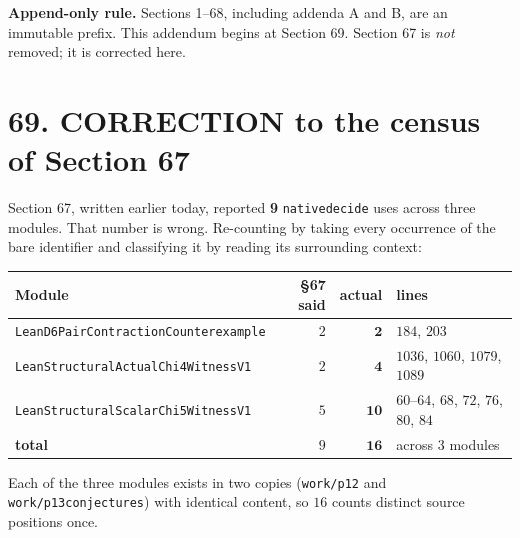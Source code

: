 \documentclass[9pt,twocolumn]{article}
\renewcommand{\_}{\CIGunderscore\allowbreak}
\begin{document}
\sloppy
{}

\textbf{Append-only rule.} Sections 1--68, including addenda A and B, are an immutable prefix. This addendum begins at Section 69. Section 67 is \emph{not} removed; it is corrected here.

\section*{69. CORRECTION to the census of Section 67}
Section 67, written earlier today, reported \textbf{9} \texttt{native\_decide} uses across three modules. That number is wrong. Re-counting by taking every occurrence of the bare identifier and classifying it by reading its surrounding context:
\begin{center}\scriptsize
\begin{tabularx}{0.98\columnwidth}{X r r X}
\toprule
Module & §67 said & actual & lines\\
\midrule
\texttt{Lean\allowbreak D6\allowbreak Pair\allowbreak Contraction\allowbreak Counterexample} & $2$ & $\mathbf{2}$ & $184$, $203$\\
\texttt{Lean\allowbreak Structural\allowbreak Actual\allowbreak Chi4\allowbreak WitnessV1} & $2$ & $\mathbf{4}$ & $1036$, $1060$, $1079$, $1089$\\
\texttt{Lean\allowbreak Structural\allowbreak Scalar\allowbreak Chi5\allowbreak WitnessV1} & $5$ & $\mathbf{10}$ & $60$--$64$, $68$, $72$, $76$, $80$, $84$\\
\midrule
\textbf{total} & $9$ & $\mathbf{16}$ & across $3$ modules\\
\bottomrule
\end{tabularx}
\end{center}
Each of the three modules exists in two copies (\texttt{work/p12} and \texttt{work/p13\_conjectures}) with identical content, so $16$ counts distinct source positions once.
\end{document}
